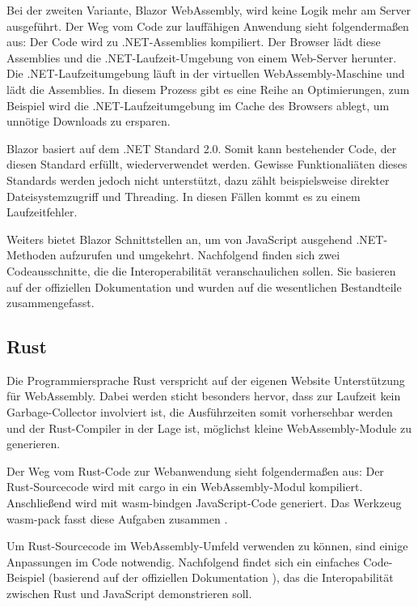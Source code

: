 Bei der zweiten Variante, Blazor WebAssembly, wird keine Logik mehr am Server ausgeführt. Der Weg vom Code zur lauffähigen Anwendung sieht folgendermaßen aus: Der Code wird zu .NET-Assemblies kompiliert. Der Browser lädt diese Assemblies und die .NET-Laufzeit-Umgebung von einem Web-Server herunter. Die .NET-Lauf\-zeit\-um\-ge\-bung läuft in der virtuellen WebAssembly-Maschine und lädt die Assemblies. In diesem Prozess gibt es eine Reihe an Optimierungen, zum Beispiel wird die .NET-Laufzeitumgebung im Cache des Browsers ablegt, um unnötige Downloads zu ersparen.

Blazor basiert auf dem .NET Standard 2.0. Somit kann bestehender Code, der diesen Standard erfüllt, wiederverwendet werden. Gewisse Funktionaliäten dieses Standards werden jedoch nicht unterstützt, dazu zählt beispielsweise direkter Dateisystemzugriff und Threading. In diesen Fällen kommt es zu einem Laufzeitfehler.

Weiters bietet Blazor Schnittstellen an, um von JavaScript ausgehend .NET-Methoden aufzurufen und umgekehrt. Nachfolgend finden sich zwei Codeausschnitte, die die Interoperabilität veranschaulichen sollen. Sie basieren auf der offiziellen Dokumentation und wurden auf die wesentlichen Bestandteile zusammengefasst.





\subsection{Rust}

Die Programmiersprache Rust verspricht auf der eigenen Website \cite{RustWasmWebsite} Unterstützung für WebAssembly. Dabei werden sticht besonders hervor, dass zur Laufzeit kein Garbage-Collector involviert ist, die Ausführzeiten somit vorhersehbar werden und der Rust-Compiler in der Lage ist, möglichst kleine WebAssembly-Module zu generieren.

Der Weg vom Rust-Code zur Webanwendung sieht folgendermaßen aus: Der Rust-Sourcecode wird mit cargo in ein WebAssembly-Modul kompiliert. Anschließend wird mit wasm-bindgen JavaScript-Code generiert. Das Werkzeug wasm-pack fasst diese Aufgaben zusammen \cite{RustWasmBook}.

Um Rust-Sourcecode im WebAssembly-Umfeld verwenden zu können, sind einige Anpassungen im Code notwendig. Nachfolgend findet sich ein einfaches Code-Beispiel (basierend auf der offiziellen Dokumentation \cite{RustWasmBook}), das die Interopabilität zwischen Rust und JavaScript demonstrieren soll.

